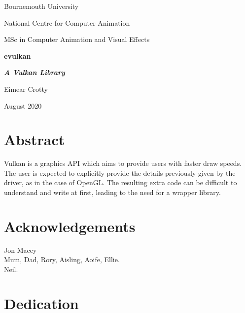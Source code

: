 \documentclass[12pt]{report}
\theoremstyle{definition}
\begin{document}
  \renewcommand{\familydefault}{\sfdefault}
  \selectfont

  \begin{titlepage}
    \centering
    {\Huge Bournemouth University\par}
    \vspace{0.5cm}
    {\Large National Centre for Computer Animation\par}
    \vspace{0.5cm}
    {\Large MSc in Computer Animation and Visual Effects\par}
    \vspace{5cm}
    {\huge \bfseries evulkan\par}
    \vspace{0.5cm}
    {\Large \bfseries \textit{A Vulkan Library}\par}
    \vspace{2cm}
    {\Large Eimear Crotty\par}
    \vfill
    {\Large August 2020}
  \end{titlepage}

  \chapter*{Abstract}
    Vulkan is a graphics API which aims to provide users with faster draw speeds.
    The user is expected to explicitly provide the details previously given by
    the driver, as in the case of OpenGL. The resulting extra code can be
    difficult to understand and write at first, leading to the need for a 
    wrapper library.

  \chapter*{Acknowledgements}

    \vspace{1cm}
    Jon Macey\\
    Mum, Dad, Rory, Aisling, Aoife, Ellie.\\
    Neil.

  \chapter*{Dedication}


  \tableofcontents
\end{document}
